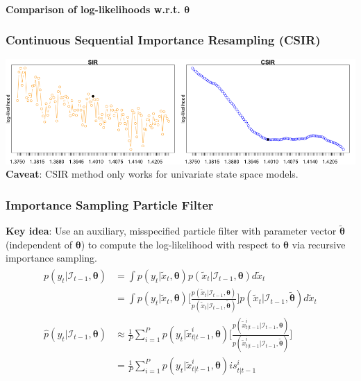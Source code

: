 \documentclass[11pt]{beamer}
\begin{document}
\begin{frame}
\framesubtitle{Comparison of log-likelihoods w.r.t. $\boldsymbol{\theta}$}
\frametitle{Continuous Sequential Importance Resampling (CSIR)}
\centering
\includegraphics[scale=0.30]{ullm-loglik-zoom-2}\\
\bigskip
\textbf{Caveat}: CSIR method only works for univariate state space models. 
\end{frame}

\begin{frame}
\frametitle{Importance Sampling Particle Filter}
\textbf{Key idea}: Use an auxiliary, misspecified particle filter with parameter vector $\boldsymbol{\tilde{\theta}}$ (independent of $\boldsymbol{\theta}$) to compute the log-likelihood with respect to $\boldsymbol{\theta}$ via recursive importance sampling.
\begin{align*} 
\begin{split}
p(y_t | \mathcal{I}_{t-1}, \boldsymbol{\theta}) &= \int p(y_t | \tilde{x}_t, \boldsymbol{\theta}) p(\tilde{x}_t | \mathcal{I}_{t-1}, \boldsymbol{\theta}) d \tilde{x}_t \\
&= \int p(y_t | \tilde{x}_t, \boldsymbol{\theta}) \bigg[ \frac{p(\tilde{x}_t | \mathcal{I}_{t-1}, \boldsymbol{\theta})}{p(\tilde{x}_t | \mathcal{I}_{t-1}, \boldsymbol{\tilde{\theta}})} \bigg] p(\tilde{x}_t | \mathcal{I}_{t-1}, \boldsymbol{\tilde{\theta}}) d \tilde{x}_t \\
\hat{p}(y_t | \mathcal{I}_{t-1}, \boldsymbol{\theta}) &\approx \frac{1}{P} \sum_{i=1}^P p(y_t | \tilde{x}_{t|t-1}^i, \boldsymbol{\theta})  \bigg[ \frac{p(\tilde{x}_{t|t-1}^i | \mathcal{I}_{t-1}, \boldsymbol{\theta})}{p(\tilde{x}_{t|t-1}^i | \mathcal{I}_{t-1}, \boldsymbol{\tilde{\theta}})} \bigg] \\
&= \frac{1}{P} \sum_{i=1}^P p(y_t | \tilde{x}_{t|t-1}^i, \boldsymbol{\theta}) is_{t|t-1}^i \\
\end{split}					
\end{align*}  
\end{frame}
\end{document}
